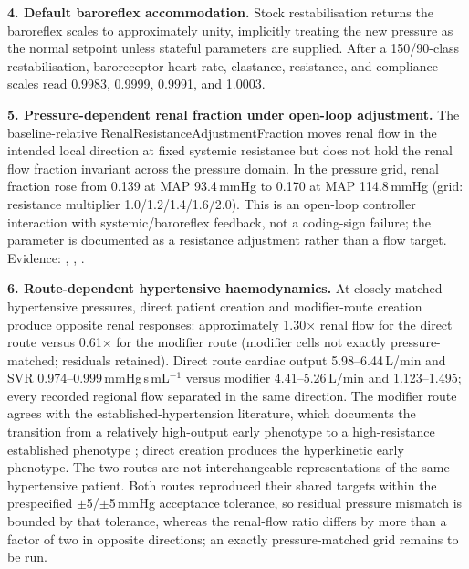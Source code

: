 \documentclass[preprint,12pt,nopreprintline]{elsarticle}
\begin{document}
\textbf{4. Default baroreflex accommodation.} Stock restabilisation returns the baroreflex scales to approximately unity, implicitly treating the new pressure as the normal setpoint unless stateful parameters are supplied. After a 150/90-class restabilisation, baroreceptor heart-rate, elastance, resistance, and compliance scales read 0.9983, 0.9999, 0.9991, and 1.0003.

\textbf{5. Pressure-dependent renal fraction under open-loop adjustment.} The baseline-relative RenalResistanceAdjustmentFraction moves renal flow in the intended local direction at fixed systemic resistance but does not hold the renal flow fraction invariant across the pressure domain. In the pressure grid, renal fraction rose from 0.139 at MAP 93.4\,mmHg to 0.170 at MAP 114.8\,mmHg (grid: resistance multiplier 1.0/1.2/1.4/1.6/2.0). This is an open-loop controller interaction with systemic/baroreflex feedback, not a coding-sign failure; the parameter is documented as a resistance adjustment rather than a flow target. Evidence: , , .

\textbf{6. Route-dependent hypertensive haemodynamics.} At closely matched hypertensive pressures, direct patient creation and modifier-route creation produce opposite renal responses: approximately 1.30$\times$ renal flow for the direct route versus 0.61$\times$ for the modifier route (modifier cells not exactly pressure-matched; residuals retained). Direct route cardiac output 5.98--6.44\,L/min and SVR 0.974--0.999\,mmHg\,s\,mL$^{-1}$ versus modifier 4.41--5.26\,L/min and 1.123--1.495; every recorded regional flow separated in the same direction. The modifier route agrees with the established-hypertension literature, which documents the transition from a relatively high-output early phenotype to a high-resistance established phenotype \cite{lundjohansen1991}; direct creation produces the hyperkinetic early phenotype. The two routes are not interchangeable representations of the same hypertensive patient. Both routes reproduced their shared targets within the prespecified $\pm$5/$\pm$5\,mmHg acceptance tolerance, so residual pressure mismatch is bounded by that tolerance, whereas the renal-flow ratio differs by more than a factor of two in opposite directions; an exactly pressure-matched grid remains to be run.
\end{document}
